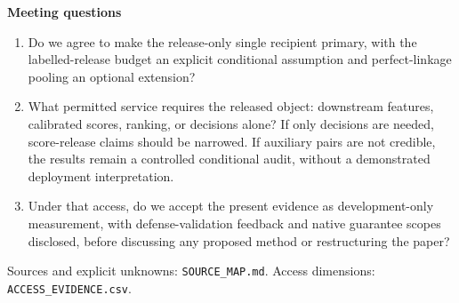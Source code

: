 \documentclass[10pt]{article}
\begin{document}
\textbf{Meeting questions}\begin{enumerate}\setlength{\itemsep}{3pt}
\item Do we agree to make the release-only single recipient primary, with the labelled-release budget an explicit conditional assumption and perfect-linkage pooling an optional extension?
\item What permitted service requires the released object: downstream features, calibrated scores, ranking, or decisions alone? If only decisions are needed, score-release claims should be narrowed. If auxiliary pairs are not credible, the results remain a controlled conditional audit, without a demonstrated deployment interpretation.
\item Under that access, do we accept the present evidence as development-only measurement, with defense-validation feedback and native guarantee scopes disclosed, before discussing any proposed method or restructuring the paper?
\end{enumerate}
\vfill{\footnotesize Sources and explicit unknowns: \texttt{SOURCE\_MAP.md}. Access dimensions: \texttt{ACCESS\_EVIDENCE.csv}.}
\end{document}
